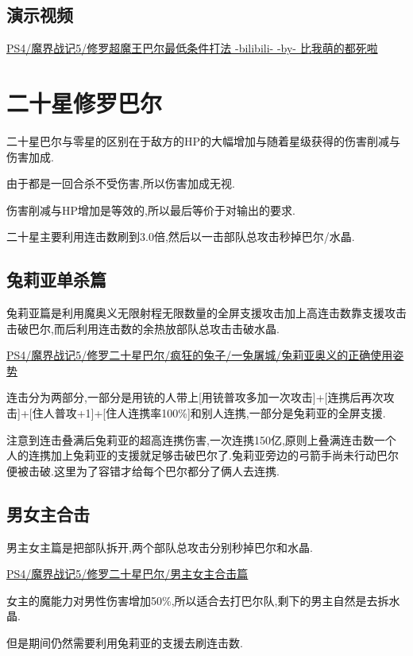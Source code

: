 	\subsection{演示视频}
	\href{http://www.bilibili.com/video/av2976870/}{PS4/魔界战记5/修罗超魔王巴尔最低条件打法 -bilibili- -by- 比我萌的都死啦}


	\newpage

	\section{二十星修罗巴尔}

	二十星巴尔与零星的区别在于敌方的HP的大幅增加与随着星级获得的伤害削减与伤害加成.

	由于都是一回合杀不受伤害,所以伤害加成无视.

	伤害削减与HP增加是等效的,所以最后等价于对输出的要求.

	二十星主要利用连击数刷到3.0倍,然后以一击部队总攻击秒掉巴尔/水晶.

	\subsection{兔莉亚单杀篇}

	兔莉亚篇是利用魔奥义无限射程无限数量的全屏支援攻击加上高连击数靠支援攻击击破巴尔,而后利用连击数的余热放部队总攻击击破水晶.

	\href{http://www.bilibili.com/video/av2989748/}{PS4/魔界战记5/修罗二十星巴尔/疯狂的兔子/一兔屠城/兔莉亚奥义的正确使用姿势}


	连击分为两部分,一部分是用铳的人带上[用铳普攻多加一次攻击]+[连携后再次攻击]+[住人普攻+1]+[住人连携率100\%]和别人连携,一部分是兔莉亚的全屏支援.

	注意到连击叠满后兔莉亚的超高连携伤害,一次连携150亿,原则上叠满连击数一个人的连携加上兔莉亚的支援就足够击破巴尔了.兔莉亚旁边的弓箭手尚未行动巴尔便被击破.这里为了容错才给每个巴尔都分了俩人去连携.

	\subsection{男女主合击}
	男主女主篇是把部队拆开,两个部队总攻击分别秒掉巴尔和水晶.
	
	\href{http://www.bilibili.com/video/av2995573/}{PS4/魔界战记5/修罗二十星巴尔/男主女主合击篇}

	女主的魔能力对男性伤害增加50\%,所以适合去打巴尔队,剩下的男主自然是去拆水晶.

	但是期间仍然需要利用兔莉亚的支援去刷连击数.

